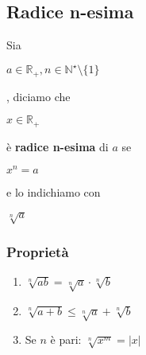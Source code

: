 \subsection{Radice n-esima}
    Sia \begin{Large}$a \in \mathbb{R}_{+}, n \in \mathbb{N}^{\star} \setminus \{1\}$ \end{Large}, diciamo che \begin{Large}$x \in \mathbb{R}_{+}$\end{Large} è \textbf{radice n-esima} di $a$
    se \begin{Large}$x^{n} = a$\end{Large} e lo indichiamo con \begin{Large} $\sqrt[{n}]{a}$ \end{Large}
    \subsubsection*{Proprietà}
        \begin{Large}
            \begin{enumerate}
                \item $\sqrt[{n}]{ab} = \sqrt[{n}]{a} \cdot \sqrt[{n}]{b}$ 
                \item $\sqrt[{n}]{a+b} \leq \sqrt[{n}]{a} + \sqrt[{n}]{b}$
                \item Se $n$ è pari: $\sqrt[{n}]{x^{m}} = |x|$
            \end{enumerate}
        \end{Large}
